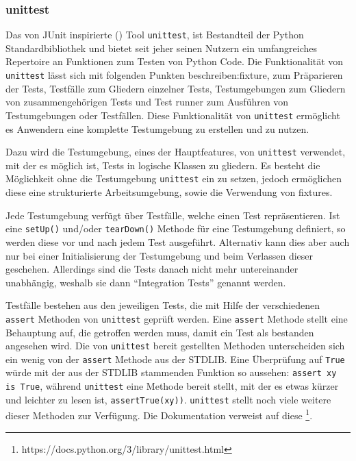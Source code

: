 \subsubsection{unittest}\label{python-tools:unittest}
Das von JUnit inspirierte (\cite{docs.python:unittest}) Tool
\lstinline{unittest}, ist Bestandteil der Python Standardbibliothek und bietet
seit jeher seinen Nutzern ein umfangreiches Repertoire an Funktionen zum Testen
von Python Code.
\noindent
Die Funktionalität von \lstinline{unittest} lässt sich mit folgenden Punkten
beschreiben:\Gls{fixture}, zum Präparieren der Tests, Testfälle zum Gliedern
einzelner Tests, Testumgebungen zum Gliedern von zusammengehörigen Tests und
Test runner zum Ausführen von Testumgebungen oder Testfällen.
Diese Funktionalität von \lstinline{unittest} ermöglicht es Anwendern eine
komplette Testumgebung zu erstellen und zu nutzen.
\newline

Dazu wird die Testumgebung, eines der Hauptfeatures, von \lstinline{unittest}
verwendet, mit der es möglich ist, Tests in logische Klassen zu gliedern. Es
besteht die Möglichkeit ohne die Testumgebung \lstinline{unittest} ein zu
setzen, jedoch ermöglichen diese eine strukturierte Arbeitsumgebung, sowie die
Verwendung von \Glspl{fixture}.

Jede Testumgebung verfügt über Testfälle, welche einen Test repräsentieren.
Ist eine \lstinline{setUp()} und/oder \lstinline{tearDown()} Methode für eine
Testumgebung definiert, so werden diese vor und nach jedem Test ausgeführt.
Alternativ kann dies aber auch nur bei einer Initialisierung der Testumgebung
und beim Verlassen dieser geschehen. Allerdings sind die Tests danach nicht
mehr untereinander unabhängig, weshalb sie dann "`Integration Tests"' genannt
werden.

Testfälle bestehen aus den jeweiligen Tests, die mit Hilfe der verschiedenen
\lstinline{assert} Methoden von \lstinline{unittest} geprüft werden. Eine
\lstinline{assert} Methode stellt eine Behauptung auf, die getroffen werden
muss, damit ein Test als bestanden angesehen wird. Die von \lstinline{unittest}
bereit gestellten Methoden unterscheiden sich ein wenig von der
\lstinline{assert} Methode aus der STDLIB. Eine Überprüfung auf
\lstinline{True} würde mit der aus der STDLIB stammenden Funktion so aussehen:
\lstinline{assert xy is True}, während \lstinline{unittest} eine Methode bereit
stellt, mit der es etwas kürzer und leichter zu lesen ist,
\lstinline{assertTrue(xy))}. \lstinline{unittest} stellt noch viele weitere
dieser Methoden zur Verfügung. Die Dokumentation verweist auf diese
\footnote{https://docs.python.org/3/library/unittest.html}.

